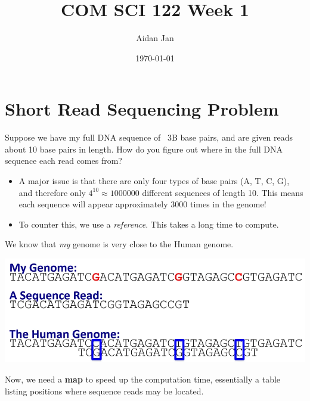 \documentclass[10pt]{article}
\title{COM SCI 122 Week 1}
\author{Aidan Jan}
\date{\today}
\begin{document}
\maketitle

\section*{Short Read Sequencing Problem}
Suppose we have my full DNA sequence of ~3B base pairs, and are given reads about 10 base pairs in length.  How do you figure out where in the full DNA sequence each read comes from?
\begin{itemize}
    \item A major issue is that there are only four types of base pairs (A, T, C, G), and therefore only $4^{10} \approx 1000000$ different sequences of length 10.  This means each sequence will appear approximately 3000 times in the genome!    \item To counter this, we use a \textit{reference}.  This takes a long time to compute.
\end{itemize}
We know that \textit{my} genome is very close to the Human genome.
\begin{center}
    \includegraphics*[width=\textwidth]{W1_1.png}
\end{center}
Now, we need a \textbf{map} to speed up the computation time, essentially a table listing positions where sequence reads may be located.
\end{document}
